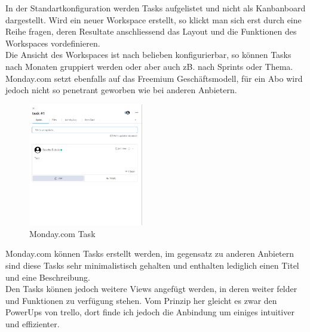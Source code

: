 In der Standartkonfiguration werden Tasks aufgelistet und nicht als Kanbanboard dargestellt.
Wird ein neuer Workspace erstellt, so klickt man sich erst durch eine Reihe fragen, deren Resultate anschliessend das Layout und die Funktionen
des Workspaces vordefinieren.\\
Die Ansicht des Workspaces ist nach belieben konfigurierbar, so können  Tasks nach Monaten gruppiert werden oder aber auch zB. nach Sprints oder Thema.
Monday.com setzt ebenfalls auf das Freemium Geschäftsmodell, für ein Abo wird jedoch nicht so penetrant geworben wie bei anderen Anbietern.\\
\space
\begin{figure}[H]
    \begin{center}
        \includegraphics[width=5cm]{../content/images/monday.com/MondayTask.png}
        \caption{Monday.com Task}
    \end{center}
\end{figure}

Monday.com können Tasks erstellt werden, im gegensatz zu anderen Anbietern sind diese Tasks
sehr minimalistisch gehalten und enthalten lediglich einen Titel und eine Beschreibung.\\
Den Tasks können jedoch weitere Views angefügt werden, in deren weiter felder und Funktionen zu verfügung stehen.
Vom Prinzip her gleicht es zwar den PowerUps von trello, dort finde ich jedoch die Anbindung um einiges
intuitiver und effizienter.\\

